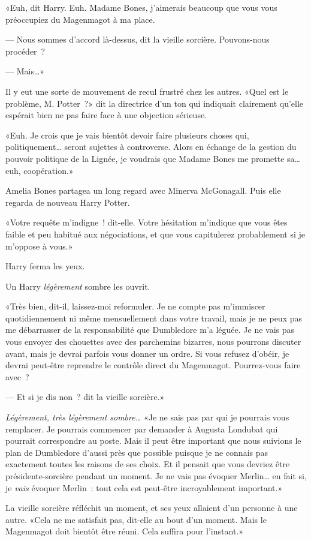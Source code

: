 «Euh, dit Harry. Euh. Madame Bones, j'aimerais beaucoup que vous vous préoccupiez du Magenmagot à ma place.

--- Nous sommes d'accord là-dessus, dit la vieille sorcière. Pouvons-nous procéder~?

--- Mais…»

Il y eut une sorte de mouvement de recul frustré chez les autres. «Quel est le problème, M. Potter~?» dit la directrice d'un ton qui indiquait clairement qu'elle espérait bien ne pas faire face à une objection sérieuse.

«Euh. Je crois que je vais bientôt devoir faire plusieurs choses qui, politiquement… seront sujettes à controverse. Alors en échange de la gestion du pouvoir politique de la Lignée, je voudrais que Madame Bones me promette sa… euh, coopération.»

Amelia Bones partagea un long regard avec Minerva McGonagall. Puis elle regarda de nouveau Harry Potter.

«Votre requête m'indigne~! dit-elle. Votre hésitation m'indique que vous êtes faible et peu habitué aux négociations, et que vous capitulerez probablement si je m'oppose à vous.»

Harry ferma les yeux.

Un Harry \emph{légèrement} sombre les ouvrit.

«Très bien, dit-il, laissez-moi reformuler. Je ne compte pas m'immiscer quotidiennement ni même mensuellement dans votre travail, mais je ne peux pas me débarrasser de la responsabilité que Dumbledore m'a léguée. Je ne vais pas vous envoyer des chouettes avec des parchemins bizarres, nous pourrons discuter avant, mais je devrai parfois vous donner un ordre. Si vous refusez d'obéir, je devrai peut-être reprendre le contrôle direct du Magenmagot. Pourrez-vous faire avec~?

--- Et si je dis non~? dit la vieille sorcière.»

\emph{Légèrement, très légèrement sombre…} «Je ne sais pas par qui je pourrais vous remplacer. Je pourrais commencer par demander à Augusta Londubat qui pourrait correspondre au poste. Mais il peut être important que nous suivions le plan de Dumbledore d'aussi près que possible puisque je ne connais pas exactement toutes les raisons de ses choix. Et il pensait que vous devriez être présidente-sorcière pendant un moment. Je ne vais pas évoquer Merlin… en fait si, je \emph{vais} évoquer Merlin~: tout cela est peut-être incroyablement important.»

La vieille sorcière réfléchit un moment, et ses yeux allaient d'un personne à une autre. «Cela ne me satisfait pas, dit-elle au bout d'un moment. Mais le Magenmagot doit bientôt être réuni. Cela suffira pour l'instant.»

